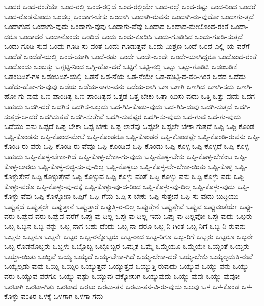 {ಒಂದರ
ಒಂದ-ರಂತೆಯೇ
ಒಂದ-ರಲ್ಲಿ
ಒಂದ-ರಲ್ಲಿದೆ
ಒಂದ-ರಲ್ಲಿಯೇ
ಒಂದ-ರಲ್ಲೆ
ಒಂದ-ರಷ್ಟು
ಒಂದ-ರಿಂದ
ಒಂದರೆ
ಒಂದ-ರೊಡನೊಂದು
ಒಂದಲ್ಲ
ಒಂದಾಗ-ಬೇಕು
ಒಂದಾಗಿ
ಒಂದಾಗಿ-ರುವನು
ಒಂದಾಗಿ-ರು-ವುದೋ
ಒಂದಾಗು-ತ್ತದೆ
ಒಂದಾಗುವ
ಒಂದಾಗು-ವುದು
ಒಂದಾಗು-ವುವು
ಒಂದಾಗು-ವೆವು
ಒಂದಾದ
ಒಂದಾದ-ಮೇಲೊಂದ-ರಂತೆ
ಒಂದಾ-ದರೂ
ಒಂದಾದರೆ
ಒಂದಾನೊಂದು
ಒಂದಿದೆ
ಒಂದು
ಒಂದು-ಕೂಡಿಸಿ
ಒಂದು-ಗೂಡಿಸಿದ
ಒಂದು-ಗೂಡಿ-ಸುತ್ತದೆ
ಒಂದು-ಗೂಡಿ-ಸುವ
ಒಂದು-ಗೂಡಿ-ಸು-ವಂತೆ
ಒಂದು-ಗೂಡುತ್ತವೆ
ಒಂದು-ಮಿಶ್ರಣ
ಒಂದೆ
ಒಂದೆ-ಎಲ್ಲಿ-ಯ-ವರೆಗೆ
ಒಂದೆಡೆ
ಒಂದೆಡೆ-ಯಲ್ಲಿ
ಒಂದೆ-ಯಾಗಿ
ಒಂದೆ-ರಡು
ಒಂದೇ
ಒಂದೇ-ಒಂದೇ
ಒಂದೇ-ಯಾಗಿದ್ದರೂ
ಒಂದೊಂದ-ರಂತೆ
ಒಂದೊಂದು
ಒಂಬತ್ತು
ಒಗ್ಗಟ್ಟಿ-ನಿಂದ
ಒಗ್ಗಿ-ಹೋ-ದರೆ
ಒಟ್ಟಿಗೆ
ಒಟ್ಟಿ-ನಲ್ಲಿ
ಒಟ್ಟು
ಒಟ್ಟು-ಗೂಡಿಸಿ
ಒಡಂಬಡಿಕೆ
ಒಡಂಬಡಿಕೆ-ಗಳ
ಒಡಂಬಡಿಕೆ-ಯಲ್ಲಿ
ಒಡನೆ
ಒಡ-ನೆಯೆ
ಒಡ-ನೆಯೇ
ಒಡ-ಹುಟ್ಟಿ-ದ-ವರಿ-ಗಿಂತ
ಒಡೆದ
ಒಡೆದು
ಒಡೆದು-ಹೋ-ಗು-ವುವು
ಒಡೆಯ
ಒಡೆಯ-ನಾಗು-ವನು
ಒಡೆಯ-ರಾಗಿ
ಒಣ
ಒಣಗಿ
ಒಣಗಿದ
ಒಣಗಿ-ಸದು
ಒಣಗಿ-ಹೋ-ಗು-ವುವು
ಒಣ-ಪಾಂಡಿತ್ಯ
ಒಣ-ಪಾಂಡಿತ್ಯದ
ಒತ್ತಡ
ಒತ್ತ-ಬೇಕು
ಒತ್ತಾ-ಯಿಸು-ವುದು
ಒತ್ತಿ
ಒತ್ತು-ವುದು
ಒದಗ-ಬಹುದು
ಒದಗಿ-ದರೆ
ಒದಗಿಸ
ಒದಗಿಸ-ಬಲ್ಲದು
ಒದ-ಗಿಸಿ-ಕೊಡು-ವುದು
ಒದ-ಗಿಸಿ-ದುವು
ಒದಗಿ-ಸುತ್ತದೆ
ಒದಗಿ-ಸುತ್ತದೆ-ಆ-ದರೆ
ಒದಗಿಸುತ್ತವೆ
ಒದಗಿ-ಸುತ್ತೇವೆ
ಒದಗಿ-ಸುವಷ್ಟರ
ಒದಗಿ-ಸು-ವುದು
ಒದ-ಗುವ
ಒದ-ಗು-ವುದು
ಒದೆಯು-ವನು
ಒಪ್ಪದೆ
ಒಪ್ಪ-ಬೇಕಾ
ಒಪ್ಪ-ಬೇಕು
ಒಪ್ಪ-ಲಾರೆವು
ಒಪ್ಪಲೇ
ಒಪ್ಪಲೇ-ಬೇಕಾ-ಗುತ್ತದೆ
ಒಪ್ಪಿ
ಒಪ್ಪಿ-ಕೊಂಡ
ಒಪ್ಪಿ-ಕೊಂಡನು
ಒಪ್ಪಿ-ಕೊಂಡ-ಮೇಲೆ
ಒಪ್ಪಿ-ಕೊಂಡರೂ
ಒಪ್ಪಿ-ಕೊಂಡರೆ
ಒಪ್ಪಿ-ಕೊಂಡಷ್ಟೇ
ಒಪ್ಪಿ-ಕೊಂಡಿ-ರುವನು
ಒಪ್ಪಿ-ಕೊಂಡಿ-ರು-ವರು
ಒಪ್ಪಿ-ಕೊಂಡಿ-ರು-ವೆವೊ
ಒಪ್ಪಿ-ಕೊಂಡಿವೆ
ಒಪ್ಪಿ-ಕೊಂಡು
ಒಪ್ಪಿ-ಕೊಳ್ಳ
ಒಪ್ಪಿ-ಕೊಳ್ಳದೆ
ಒಪ್ಪಿ-ಕೊಳ್ಳ-ಬಹುದು
ಒಪ್ಪಿ-ಕೊಳ್ಳ-ಬೇಕಾ-ಗಿದೆ
ಒಪ್ಪಿ-ಕೊಳ್ಳ-ಬೇಕಾ-ಗು-ವುದು
ಒಪ್ಪಿ-ಕೊಳ್ಳ-ಬೇಕು
ಒಪ್ಪಿ-ಕೊಳ್ಳ-ಬೇಕೆಂಬ
ಒಪ್ಪಿ-ಕೊಳ್ಳ-ಲಾರರು
ಒಪ್ಪಿ-ಕೊಳ್ಳ-ಲಿಚ್ಛಿ-ಸು-ವು-ದಿಲ್ಲ
ಒಪ್ಪಿ-ಕೊಳ್ಳಲು
ಒಪ್ಪಿ-ಕೊಳ್ಳ-ಲೇ-ಬೇಕಾ-ಯಿತು
ಒಪ್ಪಿ-ಕೊಳ್ಳಿ
ಒಪ್ಪಿ-ಕೊಳ್ಳುತ್ತೇನೆ
ಒಪ್ಪಿ-ಕೊಳ್ಳುತ್ತೇವೆ
ಒಪ್ಪಿ-ಕೊಳ್ಳುವ
ಒಪ್ಪಿ-ಕೊಳ್ಳು-ವಂತೆ
ಒಪ್ಪಿ-ಕೊಳ್ಳು-ವನು
ಒಪ್ಪಿ-ಕೊಳ್ಳು-ವರು
ಒಪ್ಪಿ-ಕೊಳ್ಳು-ವರೊ
ಒಪ್ಪಿ-ಕೊಳ್ಳು-ವು-ದಕ್ಕೆ
ಒಪ್ಪಿ-ಕೊಳ್ಳು-ವು-ದ-ರಿಂದ
ಒಪ್ಪಿ-ಕೊಳ್ಳು-ವು-ದಿಲ್ಲ
ಒಪ್ಪಿ-ಕೊಳ್ಳು-ವುದು
ಒಪ್ಪಿ-ಕೊಳ್ಳು-ವೆವು
ಒಪ್ಪಿ-ಕೊಳ್ಳೋಣ
ಒಪ್ಪಿಗೆ
ಒಪ್ಪಿ-ಗೆಯ
ಒಪ್ಪಿ-ಸ-ಬೇಕು
ಒಪ್ಪಿ-ಸುತ್ತೇನೆ
ಒಪ್ಪಿ-ಸು-ವುದು-ಬುದ್ಧಿಯು
ಒಪ್ಪುತ್ತದೆ
ಒಪ್ಪುತ್ತಲೇ
ಒಪ್ಪುತ್ತಾನೆ
ಒಪ್ಪುತ್ತಾರೆ
ಒಪ್ಪುತ್ತಿ-ರ-ಲಿಲ್ಲ
ಒಪ್ಪುತ್ತೇನೆ
ಒಪ್ಪುತ್ತೇವೆ
ಒಪ್ಪುವ
ಒಪ್ಪುವಂತೆಯೇ
ಒಪ್ಪು-ವರು
ಒಪ್ಪುವ-ವರು
ಒಪ್ಪುವ-ವರೆಗೆ
ಒಪ್ಪು-ವು-ದಿಲ್ಲ
ಒಪ್ಪು-ವು-ದಿಲ್ಲ-ಇದು
ಒಪ್ಪು-ವು-ದಿಲ್ಲವೋ
ಒಪ್ಪು-ವುದು
ಒಬ್ಪರು
ಒಬ್ಬ
ಒಬ್ಬನ
ಒಬ್ಬ-ನನ್ನು
ಒಬ್ಬ-ನಾಗ-ಬಹು-ದೆಂದು
ಒಬ್ಬ-ನಾ-ದರೂ
ಒಬ್ಬ-ನಿ-ಗಿಂತ
ಒಬ್ಬ-ನಿಗೆ
ಒಬ್ಬ-ನಿ-ರುವನು
ಒಬ್ಬನು
ಒಬ್ಬನೂ
ಒಬ್ಬನೇ
ಒಬ್ಬರ
ಒಬ್ಬ-ರನ್ನೊಬ್ಬರು
ಒಬ್ಬ-ರಾದ
ಒಬ್ಬ-ರಿಗೂ
ಒಬ್ಬ-ರಿಗೆ
ಒಬ್ಬರು
ಒಬ್ಬರೂ
ಒಬ್ಬರೇ
ಒಬ್ಬ-ರೊಡನೊಬ್ಬರು
ಒಬ್ಬಳು
ಒಬ್ಬೊಬ್ಬ
ಒಬ್ಬೊಬ್ಬರ
ಒಮ್ಮತ
ಒಮ್ಮೆ
ಒಮ್ಮೆಯೂ
ಒಮ್ಮೆಯೇ
ಒಯ್ದಂತೆ
ಒಯ್ದರು
ಒಯ್ದಾ-ಯಿತು
ಒಯ್ದಿವೆ
ಒಯ್ಯ
ಒಯ್ಯದೆ
ಒಯ್ಯ-ಬೇಕಾ-ಗಿದೆ
ಒಯ್ಯ-ಬೇಕಾ-ದರೆ
ಒಯ್ಯ-ಬೇಕು
ಒಯ್ಯಲ್ಪಡುತ್ತಿ-ರುವೆ
ಒಯ್ಯಲ್ಪಡು-ವುವು
ಒಯ್ಯಿ
ಒಯ್ಯಿರಿ
ಒಯ್ಯುತ್ತದೆ
ಒಯ್ಯುತ್ತವೆ
ಒಯ್ಯುತ್ತಿ-ರುವುದು
ಒಯ್ಯುವ
ಒಯ್ಯು-ವನು
ಒಯ್ಯು-ವರು
ಒಯ್ಯುವ-ವರೆಗೂ
ಒಯ್ಯು-ವಷ್ಟು
ಒಯ್ಯುವು-ದಕ್ಕೋಸುಗ
ಒಯ್ಯುವುದು
ಒಯ್ಯು-ವುವು
ಒಯ್ಯು-ವುವೋ
ಒರಟಾಗಿ
ಒರಟಾ-ಗಿತ್ತು
ಒರಟಾದ
ಒರಟು
ಒರಟು-ತನ
ಒರಟು-ತನ-ವಿ-ರು-ವುದು
ಒಲವು
ಒಳ
ಒಳ-ಕೊಂಡ
ಒಳ-ಕೊಳ್ಳು-ವಂತಿರ
ಒಳಕ್ಕೆ
ಒಳಗಾಗ
ಒಳಗಾ-ಗದು
}
